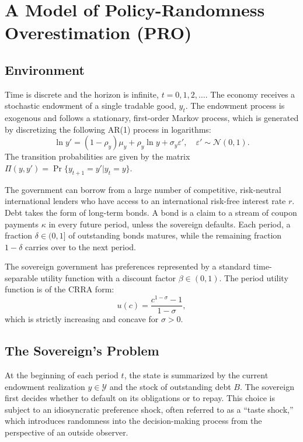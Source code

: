 \documentclass[12pt]{article}
\theoremstyle{plain}
\begin{document}
\section{A Model of Policy-Randomness Overestimation (PRO)}
\label{sec:model}

\subsection{Environment}
Time is discrete and the horizon is infinite, $t = 0, 1, 2, \dots$. The economy
receives a stochastic endowment of a single tradable good, $y_t$. The endowment
process is exogenous and follows a stationary, first-order Markov process,
which is generated by discretizing the following AR(1) process in logarithms:
\begin{equation}
	\ln y' = (1-\rho_y)\mu_y + \rho_y \ln y + \sigma_y \varepsilon', \quad \varepsilon' \sim \mathcal{N}(0, 1).
	\label{eq:endowment}
\end{equation}
The transition probabilities are given by the matrix $\Pi(y, y') = \Pr\{y_{t+1}=y'|y_t=y\}$.

The government can borrow from a large number of competitive, risk-neutral
international lenders who have access to an international risk-free interest
rate $r$. Debt takes the form of long-term bonds. A bond is a claim to a stream
of coupon payments $\kappa$ in every future period, unless the sovereign
defaults. Each period, a fraction $\delta \in (0, 1]$ of outstanding bonds
matures, while the remaining fraction $1-\delta$ carries over to the next
period.

The sovereign government has preferences represented by a standard
time-separable utility function with a discount factor $\beta \in (0, 1)$. The
period utility function is of the CRRA form:
\begin{equation}
	u(c) = \frac{c^{1-\sigma}-1}{1-\sigma},
\end{equation}
which is strictly increasing and concave for $\sigma > 0$.

\subsection{The Sovereign's Problem}
At the beginning of each period $t$, the state is summarized by the current
endowment realization $y \in \mathcal{Y}$ and the stock of outstanding debt
$B$. The sovereign first decides whether to default on its obligations or to
repay. This choice is subject to an idiosyncratic preference shock, often
referred to as a ``taste shock,'' which introduces randomness into the
decision-making process from the perspective of an outside observer.
\end{document}
